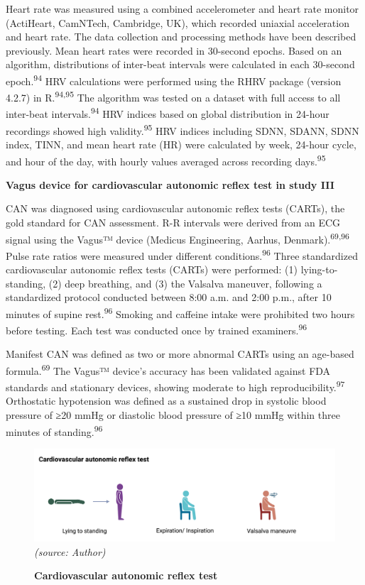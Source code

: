 \documentclass[
  a4paper,
  headsepline=true,
  open=left]{scrbook}
\begin{document}
Heart rate was measured using a combined accelerometer and heart rate
monitor (ActiHeart, CamNTech, Cambridge, UK), which recorded uniaxial
acceleration and heart rate. The data collection and processing methods
have been described previously. Mean heart rates were recorded in
30-second epochs. Based on an algorithm, distributions of inter-beat
intervals were calculated in each 30-second epoch.\textsuperscript{94}
HRV calculations were performed using the RHRV package (version 4.2.7)
in R.\textsuperscript{94,95} The algorithm was tested on a dataset with
full access to all inter-beat intervals.\textsuperscript{94} HRV indices
based on global distribution in 24-hour recordings showed high
validity.\textsuperscript{95} HRV indices including SDNN, SDANN, SDNN
index, TINN, and mean heart rate (HR) were calculated by week, 24-hour
cycle, and hour of the day, with hourly values averaged across recording
days.\textsuperscript{95}

\textbf{Vagus device for cardiovascular autonomic reflex test in study
III}

CAN was diagnosed using cardiovascular autonomic reflex tests (CARTs),
the gold standard for CAN assessment. R-R intervals were derived from an
ECG signal using the Vagus™ device (Medicus Engineering, Aarhus,
Denmark).\textsuperscript{69,96} Pulse rate ratios were measured under
different conditions.\textsuperscript{96} Three standardized
cardiovascular autonomic reflex tests (CARTs) were performed: (1)
lying-to-standing, (2) deep breathing, and (3) the Valsalva maneuver,
following a standardized protocol conducted between 8:00 a.m. and 2:00
p.m., after 10 minutes of supine rest.\textsuperscript{96} Smoking and
caffeine intake were prohibited two hours before testing. Each test was
conducted once by trained examiners.\textsuperscript{96}

Manifest CAN was defined as two or more abnormal CARTs using an
age-based formula.\textsuperscript{69} The Vagus™ device's accuracy has
been validated against FDA standards and stationary devices, showing
moderate to high reproducibility.\textsuperscript{97} Orthostatic
hypotension was defined as a sustained drop in systolic blood pressure
of ≥20 mmHg or diastolic blood pressure of ≥10 mmHg within three minutes
of standing.\textsuperscript{96}

\begin{figure}

{\centering 

\includegraphics{images/cart.png} \emph{(source: Author)}

}

\caption{\label{fig-cart}\textbf{Cardiovascular autonomic reflex test}}

\end{figure}
\end{document}
